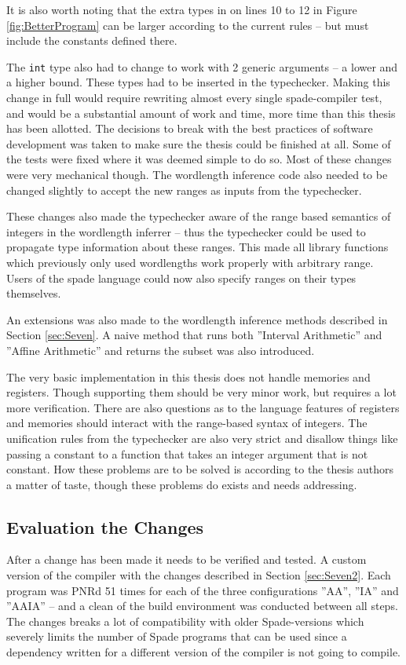 It is also worth noting that the extra types in on lines 10 to 12 in Figure \ref{fig:BetterProgram} can be larger according to the current rules -- but must include the constants defined there.

The \verb+int+ type also had to change to work with 2 generic arguments -- a lower and a higher bound. These types had to be inserted in the typechecker. Making this change in full would require rewriting almost every single spade-compiler test, and would be a substantial amount of work and time, more time than this thesis has been allotted. The decisions to break with the best practices of software development was taken to make sure the thesis could be finished at all. Some of the tests were fixed where it was deemed simple to do so. Most of these changes were very mechanical though. The wordlength inference code also needed to be changed slightly to accept the new ranges as inputs from the typechecker.

These changes also made the typechecker aware of the range based semantics of integers in the wordlength inferrer -- thus the typechecker could be used to propagate type information about these ranges. This made all library functions which previously only used wordlengths work properly with arbitrary range. Users of the spade language could now also specify ranges on their types themselves.

An extensions was also made to the wordlength inference methods described in Section \ref{sec:Seven}. A naive method that runs both ''Interval Arithmetic'' and ''Affine Arithmetic'' and returns the subset was also introduced.

The very basic implementation in this thesis does not handle memories and registers. Though supporting them should be very minor work, but requires a lot more verification. There are also questions as to the language features of registers and memories should interact with the range-based syntax of integers. The unification rules from the typechecker are also very strict and disallow things like passing a constant to a function that takes an integer argument that is not constant. How these problems are to be solved is according to the thesis authors a matter of taste, though these problems do exists and needs addressing. 

\subsection{Evaluation the Changes}
After a change has been made it needs to be verified and tested. A custom version of the compiler with the changes described in Section \ref{sec:Seven2}. Each program was PNRd 51 times for each of the three configurations ''AA'', ''IA'' and ''AAIA'' -- and a clean of the build environment was conducted between all steps. The changes breaks a lot of compatibility with older Spade-versions which severely limits the number of Spade programs that can be used since a dependency written for a different version of the compiler is not going to compile.

